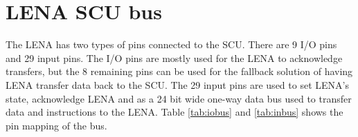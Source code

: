 \section{LENA SCU bus}
The LENA has two types of pins connected to the SCU. There are 9 I/O pins and 29 input pins. The I/O pins are mostly used for the LENA to acknowledge transfers, but the 8 remaining pins can be used for the fallback solution of having LENA transfer data back to the SCU. The 29 input pins are used to set LENA's state, acknowledge LENA and as a 24 bit wide one-way data bus used to transfer data and instructions to the LENA. Table \ref{tab:iobus} and \ref{tab:inbus} shows the pin mapping of the bus.



